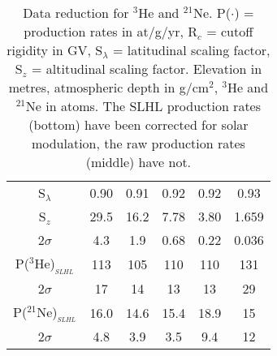 \documentclass{article}
\begin{document}
\begin{table}[htbp]
\begin{tabular}{cccccc}
S$_{\lambda}$   & 0.90 & 0.91 & 0.92 & 0.92 & 0.93\\
S$_{z}$ & 29.5  & 16.2  & 7.78  & 3.80  & 1.659\\
2$\sigma$ &     4.3   & 1.9 & 0.68 & 0.22 & 0.036\\
P($^3$He)$_{_{SLHL}}$   & 113 & 105 & 110 & 110 & 131\\
2$\sigma$ & 17 & 14   & 13   & 13  & 29\\
P($^{21}$Ne)$_{_{SLHL}}$        & 16.0  & 14.6  & 15.4  & 18.9  & 15\\
2$\sigma$ & 4.8 & 3.9   & 3.5   & 9.4   & 12
\end{tabular}
\caption{Data reduction for $^{3}$He and $^{21}$Ne.  P($\cdot$) =
  production rates in at/g/yr, R$_c$ = cutoff rigidity in GV,
  S$_{\lambda}$ = latitudinal scaling factor, S$_{z}$ = altitudinal
  scaling factor. Elevation in metres, atmospheric depth in g/cm$^2$,
  $^{3}$He and $^{21}$Ne in atoms.  The SLHL production rates (bottom)
  have been corrected for solar modulation, the raw production rates
  (middle) have not.}
  \label{tab:3He21Ne}
\end{table}
\end{document}
